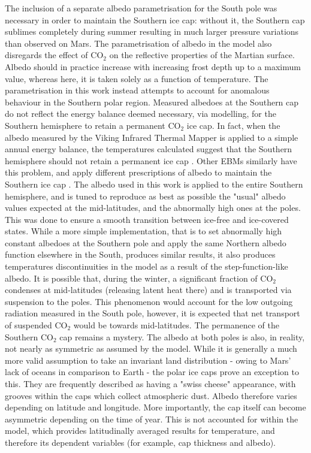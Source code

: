 \documentclass[12pt,onecolumn]{revtex4-2}    %
\begin{document}
The inclusion of a separate albedo parametrisation for the South pole was necessary in order to maintain the Southern ice cap: without it, the Southern cap sublimes completely during summer resulting in much larger pressure variations than observed on Mars. The parametrisation of albedo in the model also disregards the effect of $\mathrm{CO_2}$ on the reflective properties of the Martian surface. Albedo should in practice increase with increasing frost depth up to a maximum value, whereas here, it is taken solely as a function of temperature. The parametrisation in this work instead attempts to account for anomalous behaviour in the Southern polar region. Measured albedoes at the Southern cap do not reflect the energy balance deemed necessary, via modelling, for the Southern hemisphere to retain a permanent $\mathrm{CO_2}$ ice cap. In fact, when the albedo measured by the Viking Infrared Thermal Mapper is applied to a simple annual energy balance, the temperatures calculated suggest that the Southern hemisphere should not retain a permanent ice cap \cite{K79}. Other EBMs similarly have this problem, and apply different prescriptions of albedo to maintain the Southern ice cap \cite{FHT98} \cite{JN82}. The albedo used in this work is applied to the entire Southern hemisphere, and is tuned to reproduce as best as possible the "usual" albedo values expected at the mid-latitudes, and the abnormally high ones at the poles. This was done to ensure a smooth transition between ice-free and ice-covered states. While a more simple implementation, that is to set abnormally high constant albedoes at the Southern pole and apply the same Northern albedo function elsewhere in the South, produces similar results, it also produces temperatures discontinuities in the model as a result of the step-function-like albedo. It is possible that, during the winter, a significant fraction of $\mathrm{CO_2}$ condenses at mid-latitudes (releasing latent heat there) and is transported via suspension to the poles. This phenomenon would account for the low outgoing radiation measured in the South pole, however, it is expected that net transport of suspended $\mathrm{CO_2}$ would be towards mid-latitudes. The permanence of the Southern $\mathrm{CO_2}$ cap remains a mystery. The albedo at both poles is also, in reality, not nearly as symmetric as assumed by the model. While it is generally a much more valid assumption to take an invariant land distribution - owing to Mars' lack of oceans in comparison to Earth - the polar ice caps prove an exception to this. They are frequently described as having a "swiss cheese" appearance, with grooves within the caps which collect atmospheric dust. Albedo therefore varies depending on latitude and longitude. More importantly, the cap itself can become asymmetric depending on the time of year. This is not accounted for within the model, which provides latitudinally averaged results for temperature, and therefore its dependent variables (for example, cap thickness and albedo). 
\end{document}
